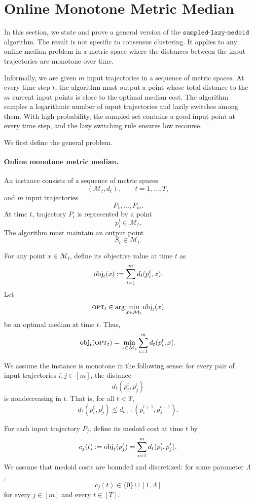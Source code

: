 \section{Online Monotone Metric Median}

In this section, we state and prove a general version of the
\(\texttt{sampled-lazy-medoid}\) algorithm. The result is not specific to
consensus clustering. It applies to any online median problem in a metric space
where the distances between the input trajectories are monotone over time.

Informally, we are given \(m\) input trajectories in a sequence of metric
spaces. At every time step \(t\), the algorithm must output a point whose total
distance to the \(m\) current input points is close to the optimal median cost.
The algorithm samples a logarithmic number of input trajectories and lazily
switches among them. With high probability, the sampled set contains a good
input point at every time step, and the lazy switching rule ensures low
recourse.

We first define the general problem.

\paragraph{Online monotone metric median.}
An instance consists of a sequence of metric spaces
\[
    (\mathcal M_t,d_t), \qquad t=1,\ldots,T,
\]
and \(m\) input trajectories
\[
    P_1,\ldots,P_m.
\]
At time \(t\), trajectory \(P_i\) is represented by a point
\[
    p_i^t\in \mathcal M_t.
\]
The algorithm must maintain an output point
\[
    S_t\in \mathcal M_t.
\]

For any point \(x\in\mathcal M_t\), define its objective value at time \(t\) as
\[
    \text{obj}_t(x)
    :=
    \sum_{i=1}^m d_t(p_i^t,x).
\]
Let
\[
    \textsc{opt}_t
    \in
    \arg\min_{x\in\mathcal M_t}\text{obj}_t(x)
\]
be an optimal median at time \(t\). Thus,
\[
    \text{obj}_t(\textsc{opt}_t)
    =
    \min_{x\in\mathcal M_t}
    \sum_{i=1}^m d_t(p_i^t,x).
\]

We assume the instance is monotone in the following sense: for every pair of
input trajectories \(i,j\in[m]\), the distance
\[
    d_t(p_i^t,p_j^t)
\]
is nondecreasing in \(t\). That is, for all \(t<T\),
\[
    d_t(p_i^t,p_j^t)
    \le
    d_{t+1}(p_i^{t+1},p_j^{t+1}).
\]

For each input trajectory \(P_j\), define its medoid cost at time \(t\) by
\[
    c_j(t)
    :=
    \text{obj}_t(p_j^t)
    =
    \sum_{i=1}^m d_t(p_i^t,p_j^t).
\]
We assume that medoid costs are bounded and discretized: for some parameter
\(\Lambda\),
\[
    c_j(t)\in \{0\}\cup [1,\Lambda]
\]
for every \(j\in[m]\) and every \(t\in[T]\).

